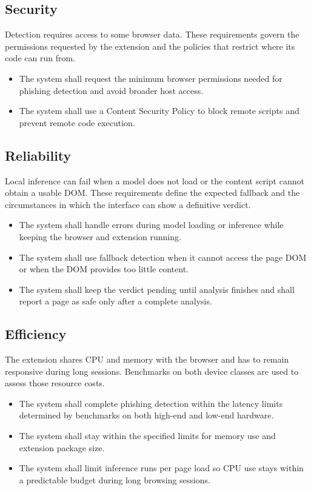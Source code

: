 \documentclass{FastFyp}
\begin{document}
\subsection{Security}
Detection requires access to some browser data. These requirements govern the permissions requested by the extension and the policies that restrict where its code can run from.

\begin{itemize}
    \item The system shall request the minimum browser permissions needed for phishing detection and avoid broader host access.
    \item The system shall use a Content Security Policy to block remote scripts and prevent remote code execution.
\end{itemize}

\subsection{Reliability}
Local inference can fail when a model does not load or the content script cannot obtain a usable DOM. These requirements define the expected fallback and the circumstances in which the interface can show a definitive verdict.

\begin{itemize}
    \item The system shall handle errors during model loading or inference while keeping the browser and extension running.
    \item The system shall use fallback detection when it cannot access the page DOM or when the DOM provides too little content.
    \item The system shall keep the verdict pending until analysis finishes and shall report a page as safe only after a complete analysis.
\end{itemize}

\subsection{Efficiency}
The extension shares CPU and memory with the browser and has to remain responsive during long sessions. Benchmarks on both device classes are used to assess those resource costs.

\begin{itemize}
    \item The system shall complete phishing detection within the latency limits determined by benchmarks on both high-end and low-end hardware.
    \item The system shall stay within the specified limits for memory use and extension package size.
    \item The system shall limit inference runs per page load so CPU use stays within a predictable budget during long browsing sessions.
\end{itemize}
\end{document}
